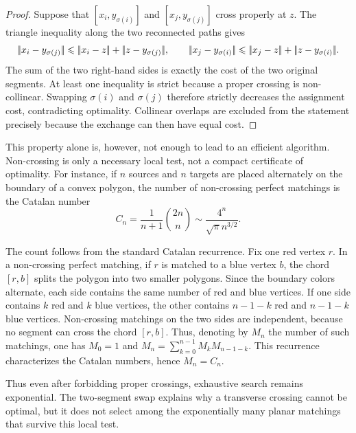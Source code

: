 \begin{proof}
	Suppose that $[x_i,y_{\sigma(i)}]$ and $[x_j,y_{\sigma(j)}]$ cross properly at $z$. The triangle inequality along the two reconnected paths gives
		\[
			\norm{x_i-y_{\sigma(j)}}
			\leq
			\norm{x_i-z}+\norm{z-y_{\sigma(j)}}
			,\qquad
			\norm{x_j-y_{\sigma(i)}}
			\leq
			\norm{x_j-z}+\norm{z-y_{\sigma(i)}}.
	\]
	The sum of the two right-hand sides is exactly the cost of the two original segments. At least one inequality is strict because a proper crossing is non-collinear. Swapping $\sigma(i)$ and $\sigma(j)$ therefore strictly decreases the assignment cost, contradicting optimality. Collinear overlaps are excluded from the statement precisely because the exchange can then have equal cost.
\end{proof}

This property alone is, however, not enough to lead to an efficient algorithm. Non-crossing is only a necessary local test, not a compact certificate of optimality. For instance, if $n$ sources and $n$ targets are placed alternately on the boundary of a convex polygon, the number of non-crossing perfect matchings is the Catalan number
\[
	C_n=\frac{1}{n+1}\binom{2n}{n}\sim \frac{4^n}{\sqrt{\pi}n^{3/2}}.
\]

\begin{rem}
		The count follows from the standard Catalan recurrence. Fix one red vertex $r$. In a non-crossing perfect matching, if $r$ is matched to a blue vertex $b$, the chord $[r,b]$ splits the polygon into two smaller polygons. Since the boundary colors alternate, each side contains the same number of red and blue vertices. If one side contains $k$ red and $k$ blue vertices, the other contains $n-1-k$ red and $n-1-k$ blue vertices. Non-crossing matchings on the two sides are independent, because no segment can cross the chord $[r,b]$. Thus, denoting by $M_n$ the number of such matchings,
		one has $M_0=1$ and $M_n=\sum_{k=0}^{n-1}M_kM_{n-1-k}$.
	This recurrence characterizes the Catalan numbers, hence $M_n=C_n$.
\end{rem}

Thus even after forbidding proper crossings, exhaustive search remains exponential. The two-segment swap explains why a transverse crossing cannot be optimal, but it does not select among the exponentially many planar matchings that survive this local test.


